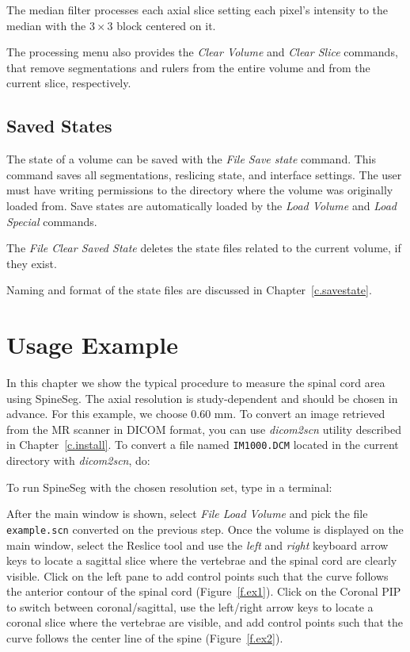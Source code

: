 \documentclass[12pt]{report}
\begin{document}
The median filter processes each axial slice setting each pixel's intensity to the median
with the $3 \times 3$ block centered on it.

The processing menu also provides the \emph{Clear Volume} and \emph{Clear
  Slice} commands, that remove segmentations and rulers from the
entire volume and from the current slice, respectively.

\section{Saved States}

The state of a volume can be saved with the \emph{File \btr Save state} command. This command
saves all segmentations, reslicing state, and interface settings. The user must
have writing permissions to the directory where the volume was originally loaded from. 
Save states are automatically loaded by the \emph{Load Volume} and \emph{Load Special} commands.

The \emph{File \btr Clear Saved State} deletes the state files related to the current
volume, if they exist.

Naming and format of the state files are discussed in Chapter~\ref{c.savestate}.

\chapter{Usage Example}

In this chapter we show the typical procedure to measure the spinal
cord area using SpineSeg.  The axial resolution is study-dependent and
should be chosen in advance. For this example, we choose 0.60 mm. To
convert an image retrieved from the MR scanner in DICOM format, you
can use \emph{dicom2scn} utility described in
Chapter~\ref{c.install}. To convert a file named \texttt{IM1000.DCM}
located in the current directory with \emph{dicom2scn}, do:


To run SpineSeg with the chosen resolution set, type in a terminal:


After the main window is shown, select \emph{File \btr Load Volume}
and pick the file \texttt{example.scn} converted on the previous
step. Once the volume is displayed on the main window, select the
Reslice tool and use the \emph{left} and \emph{right} keyboard arrow
keys to locate a sagittal slice where the vertebrae and the spinal
cord are clearly visible. Click on the left pane to add control points
such that the curve follows the anterior contour of the spinal cord (Figure~\ref{f.ex1}).
Click on the Coronal PIP to switch between coronal/sagittal, use the left/right arrow keys
to locate a coronal slice where the vertebrae are visible, and add control points
such that the curve follows the center line of the spine (Figure~\ref{f.ex2}).
\end{document}
